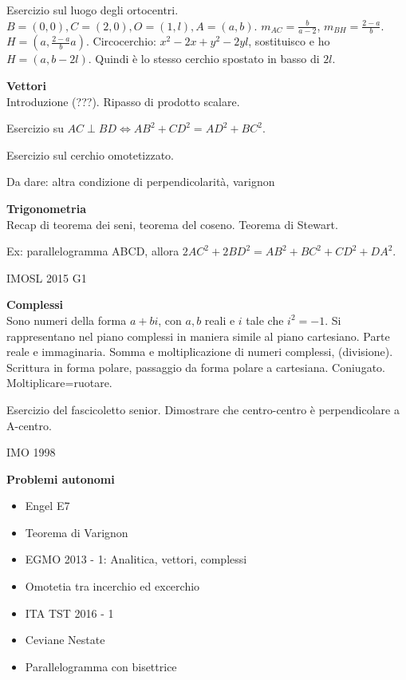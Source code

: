 \vspace{0.3cm}

Esercizio sul luogo degli ortocentri. $B=(0,0),C=(2,0),O=(1,l),A=(a,b)$. 
$m_{AC}=\frac{b}{a-2}$, $m_{BH}=\frac{2-a}{b}$. $H=(a,\frac{2-a}{b}a)$.
Circocerchio: $x^2-2x+y^2-2yl$, sostituisco e ho $H=(a,b-2l)$. Quindi è lo stesso cerchio spostato in basso di $2l$.

\vspace{0.4cm}
\textbf{Vettori}\\
Introduzione (???). Ripasso di prodotto scalare.

Esercizio su $AC\perp BD \iff AB^2+CD^2=AD^2+BC^2$. 

Esercizio sul cerchio omotetizzato. 

Da dare: altra condizione di perpendicolarità, varignon


\textbf{Trigonometria}\\
Recap di teorema dei seni, teorema del coseno. Teorema di Stewart.

Ex: parallelogramma ABCD, allora $2AC^2+2BD^2=AB^2+BC^2+CD^2+DA^2$.

IMOSL 2015 G1



\vspace{0.4cm}
\textbf{Complessi}\\
Sono numeri della forma $a+bi$, con $a,b$ reali e $i$ tale che $i^2=-1$. Si rappresentano nel piano complessi in maniera simile al piano cartesiano. Parte reale e immaginaria. Somma e moltiplicazione di numeri complessi, (divisione).\\
Scrittura in forma polare, passaggio da forma polare a cartesiana. Coniugato. Moltiplicare=ruotare. 

Esercizio del fascicoletto senior. Dimostrare che centro-centro è perpendicolare a A-centro.

IMO 1998


\vspace{0.4cm}
\Large \textbf{Problemi autonomi}\normalsize
\begin{itemize}
 \item Engel E7
 \item Teorema di Varignon 
 \item EGMO 2013 - 1: Analitica, vettori, complessi
 \item Omotetia tra incerchio ed excerchio
 \item ITA TST 2016 - 1
 \item Ceviane Nestate
 \item Parallelogramma con bisettrice
 
\end{itemize}





